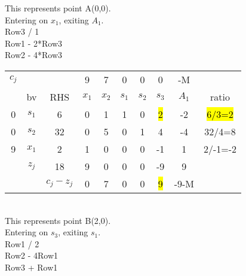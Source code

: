\documentclass[answers]{exam}
\begin{document}
\noindent
This represents point A(0,0). \\
Entering on $x_1$, exiting $A_1$. \\
Row3 / 1 \\
Row1 - 2*Row3 \\
Row2 - 4*Row3 \\


\begin{tabular}{cccccccccc}
	$c_j$                  &                            &                                & 9     & 7     & 0     & 0     & 0     & -M    &         \\
	\multicolumn{1}{c|}{}  & \multicolumn{1}{c|}{bv}    & \multicolumn{1}{c|}{RHS}       & $x_1$ & $x_2$ & $s_1$ & $s_2$ & $s_3$ & $A_1$ & ratio   \\ \cline{1-9}
	\multicolumn{1}{c|}{0} & \multicolumn{1}{c|}{$s_1$} & \multicolumn{1}{c|}{6}         & 0     & 1     & 1     & 0     & \hl{2}     & -2    & \hl{6/3=2}   \\
	\multicolumn{1}{c|}{0} & \multicolumn{1}{c|}{$s_2$} & \multicolumn{1}{c|}{32}        & 0     & 5     & 0     & 1     & 4     & -4    & 32/4=8  \\
	\multicolumn{1}{c|}{9} & \multicolumn{1}{c|}{$x_1$} & \multicolumn{1}{c|}{2}         & 1     & 0     & 0     & 0     & -1    & 1     & 2/-1=-2 \\ \cline{1-9}
	& \multicolumn{1}{c|}{$z_j$} & \multicolumn{1}{c|}{18}        & 9     & 0     & 0     & 0     & -9    & 9     &         \\ \cline{3-9}
	&                            & \multicolumn{1}{c|}{$c_j-z_j$} & 0     & 7     & 0     & 0     & \hl{9}     & -9-M  &        
\end{tabular} \\

\noindent
This represents point B(2,0). \\
Entering on $s_3$, exiting $s_1$. \\
Row1 / 2 \\
Row2 - 4Row1 \\
Row3 + Row1 \\
\end{document}

